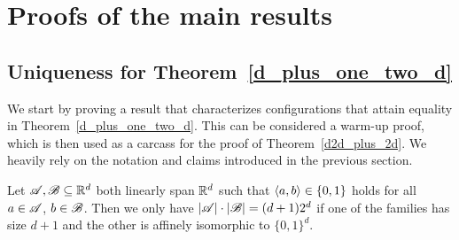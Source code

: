 \section{Proofs of the main results}
\subsection{Uniqueness for Theorem~\ref{d_plus_one_two_d}}\label{sec31}

We start by proving a result that characterizes configurations that attain equality  in Theorem~\ref{d_plus_one_two_d}. This can be considered a warm-up proof, which is then used as a carcass for the proof of Theorem~\ref{d2d_plus_2d}. We heavily rely on the notation and claims introduced in the previous section.

\begin{theorem}\label{uniq}
    Let ${\mathscr{A}},{\mathscr{B}} \subseteq {\mathbb{R}}^d$ both linearly span ${\mathbb{R}}^d$ such that $\langle a, b\rangle \in \{0,1\}$ holds for all $a \in {\mathscr{A}}$, $b \in {\mathscr{B}}$. Then we only have $|{\mathscr{A}}| \cdot |{\mathscr{B}}| = (d+1) 2^d$ if one of the families has size $d+1$ and the other is affinely isomorphic to $\{0,1\}^d$.
\end{theorem}
